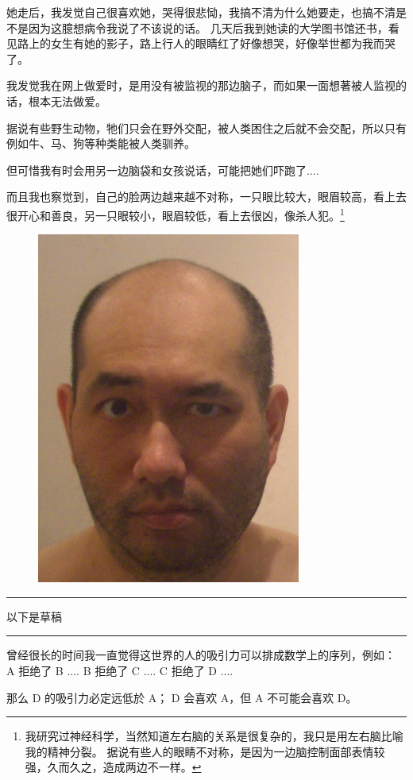 \documentclass[12pt]{report}
\newcommand{\tab}{\hspace*{1cm}}
\newcommand*\todo{\begin{center}\color{red}  \rule{5cm}{0.5pt} 以下是草稿\, \rule{5cm}{0.5pt} \end{center}}
\begin{document}
她走后，我发觉自己很喜欢她，哭得很悲恸，我搞不清为什么她要走，也搞不清是不是因为这臆想病令我说了不该说的话。 几天后我到她读的大学图书馆还书，看见路上的女生有她的影子，路上行人的眼睛红了好像想哭，好像举世都为我而哭了。

我发觉我在网上做爱时，是用没有被监视的那边脑子，而如果一面想著被人监视的话，根本无法做爱。

据说有些野生动物，牠们只会在野外交配，被人类困住之后就不会交配，所以只有例如牛、马、狗等种类能被人类驯养。

但可惜我有时会用另一边脑袋和女孩说话，可能把她们吓跑了....

而且我也察觉到，自己的脸两边越来越不对称，一只眼比较大，眼眉较高，看上去很开心和善良，另一只眼较小，眼眉较低，看上去很凶，像杀人犯。\footnote{我研究过神经科学，当然知道左右脑的关系是很复杂的，我只是用左右脑比喻我的精神分裂。 据说有些人的眼睛不对称，是因为一边脑控制面部表情较强，久而久之，造成两边不一样。}

\begin{figure}
\centering
\includegraphics[scale=0.6]{2015June.jpg}
\end{figure}

\todo

曾经很长的时间我一直觉得这世界的人的吸引力可以排成数学上的序列，例如： \\
\tab \tab \tab A 拒绝了 B .... B 拒绝了 C .... C 拒绝了 D .... 
\begin{center}
\end{center}
那么 D 的吸引力必定远低於 A； D 会喜欢 A，但 A 不可能会喜欢 D。
\end{document}
